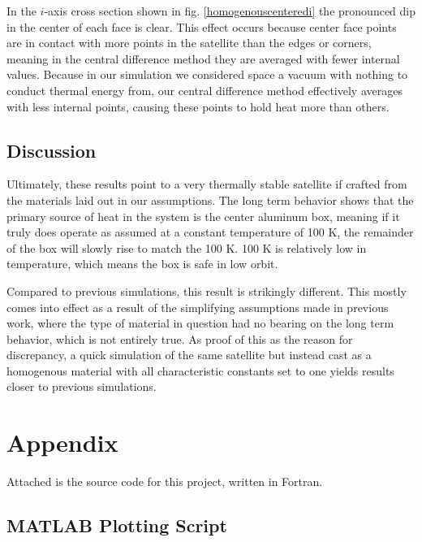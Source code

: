 \documentclass[12pt]{article}
\begin{document}
In the $i$-axis cross section shown in fig. \ref{homogenouscenteredi} the pronounced dip in the center of each face is clear.  This effect occurs because center face points are in contact with more points in the satellite than the edges or corners, meaning in the central difference method they are averaged with fewer internal values.  Because in our simulation we considered space a vacuum with nothing to conduct thermal energy from, our central difference method effectively averages with less internal points, causing these points to hold heat more than others.
 
\subsection*{Discussion}
Ultimately, these results point to a very thermally stable satellite if crafted from the materials laid out in our assumptions.  The long term behavior shows that the primary source of heat in the system is the center aluminum box, meaning if it truly does operate as assumed at a constant temperature of 100 K, the remainder of the box will slowly rise to match the 100 K.  100 K is relatively low in temperature, which means the box is safe in low orbit.  

Compared to previous simulations, this result is strikingly different.  This mostly comes into effect as a result of the simplifying assumptions made in previous work, where the type of material in question had no bearing on the long term behavior, which is not entirely true.  As proof of this as the reason for discrepancy, a quick simulation of the same satellite but instead cast as a homogenous material with all characteristic constants set to one yields results closer to previous simulations.

\pagebreak


\pagebreak
\section*{Appendix}
Attached is the source code for this project, written in Fortran.


\subsection*{MATLAB Plotting Script}

\end{document}

